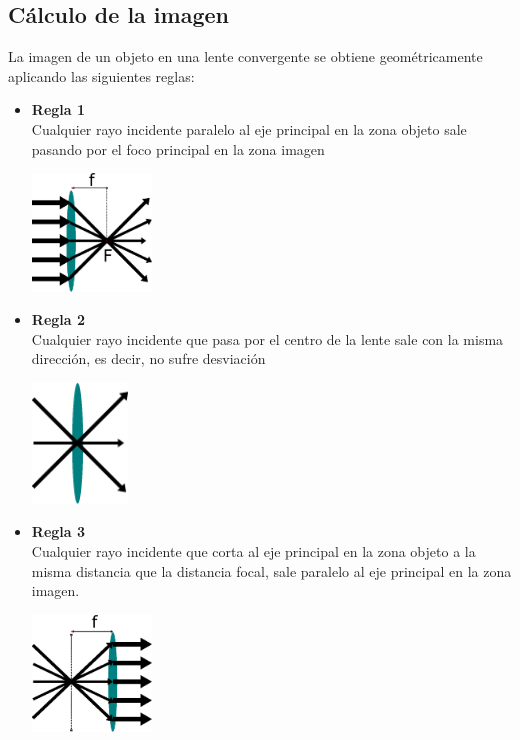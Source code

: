 \subsection{Cálculo de la imagen}
La imagen de un objeto en una lente convergente se obtiene geométricamente aplicando las siguientes reglas:
\begin{itemize}
    \item \textbf{Regla 1}\\
    Cualquier rayo incidente paralelo al eje principal en la zona objeto sale pasando por el foco principal en la zona imagen
    \begin{center}
        \includegraphics[width=0.25\textwidth]{Capitulo2/Fig1_7.eps}
        \label{Fig1_7}
    \end{center}
    \item \textbf{Regla 2}\\
    Cualquier rayo incidente que pasa por el centro de la lente sale con la misma dirección, es decir, no sufre desviación
    \begin{center}
        \includegraphics[width=0.2\textwidth]{Capitulo2/Fig1_8.eps}
        \label{Fig1_7}
    \end{center}
    \item \textbf{Regla 3}\\
    Cualquier rayo incidente que corta al eje principal en la zona objeto a la misma distancia que la distancia focal, sale 
    paralelo al eje principal en la zona imagen.
    \begin{center}
        \includegraphics[width=0.25\textwidth]{Capitulo2/Fig1_9.eps}
        \label{Fig1_7}
    \end{center}

\end{itemize}
